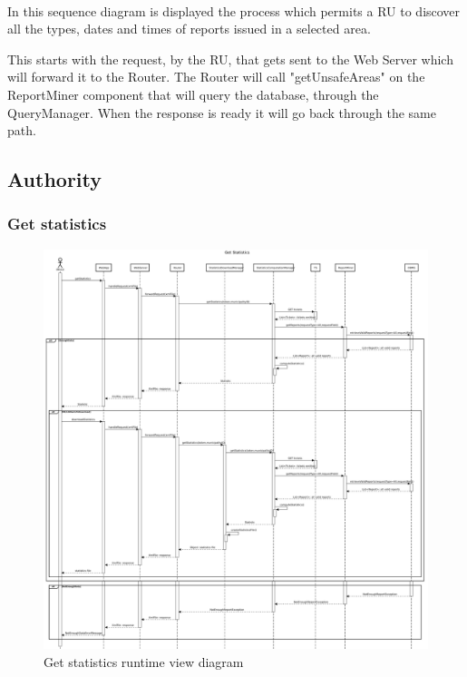 					\paragraph{}
						In this sequence diagram is displayed the process which permits a RU to discover all the types, dates and times of reports issued in a selected area. 
						
						This starts with the request, by the RU, that gets sent to the Web Server which will forward it to the Router. The Router will call "getUnsafeAreas" on the ReportMiner component that will query the database, through the QueryManager. When the response is ready it will go back through the same path.
			\clearpage
			\subsection{Authority}
				\subsubsection{Get statistics}
					\begin{figure}[!h]
						\centering
						\includegraphics[width=\textwidth]{images/DD2/RuntimeView/Authority/GetStatistics.pdf}
						\caption{Get statistics runtime view diagram}
					\end{figure}
